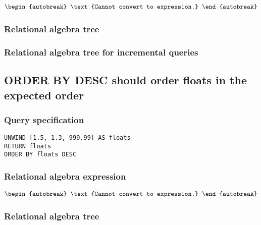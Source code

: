 \begin{align*}
\begin{autobreak}
\text{Cannot convert to expression.}
\end{autobreak}
\end{align*}

\subsubsection*{Relational algebra tree}


\subsubsection*{Relational algebra tree for incremental queries}


\subsection{ORDER BY DESC should order floats in the expected order}

\subsubsection*{Query specification}

\begin{lstlisting}
UNWIND [1.5, 1.3, 999.99] AS floats
RETURN floats
ORDER BY floats DESC
\end{lstlisting}

\subsubsection*{Relational algebra expression}

\begin{align*}
\begin{autobreak}
\text{Cannot convert to expression.}
\end{autobreak}
\end{align*}

\subsubsection*{Relational algebra tree}


